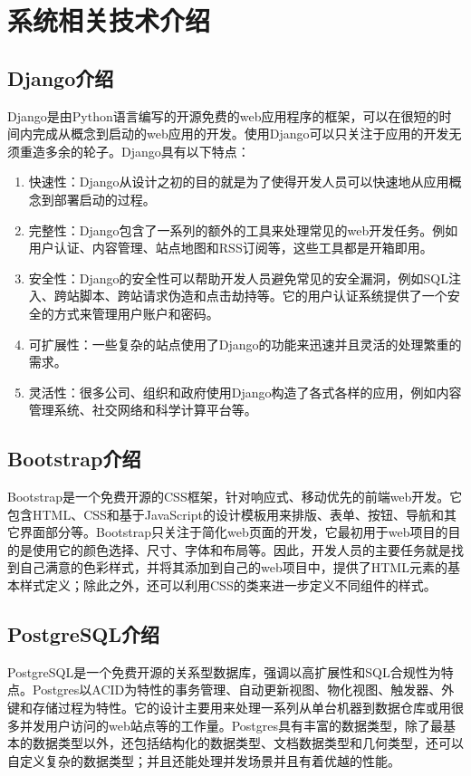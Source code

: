 \section{系统相关技术介绍}

\subsection{Django介绍}

Django是由Python语言编写的开源免费的web应用程序的框架，可以在很短的时间内完成从概念到启动的web应用的开发。使用Django可以只关注于应用的开发无须重造多余的轮子。Django具有以下特点：

\begin{enumerate}
    \item 快速性：Django从设计之初的目的就是为了使得开发人员可以快速地从应用概念到部署启动的过程。
    \item 完整性：Django包含了一系列的额外的工具来处理常见的web开发任务。例如用户认证、内容管理、站点地图和RSS订阅等，这些工具都是开箱即用。
    \item 安全性：Django的安全性可以帮助开发人员避免常见的安全漏洞，例如SQL注入、跨站脚本、跨站请求伪造和点击劫持等。它的用户认证系统提供了一个安全的方式来管理用户账户和密码。
    \item 可扩展性：一些复杂的站点使用了Django的功能来迅速并且灵活的处理繁重的需求。
    \item 灵活性：很多公司、组织和政府使用Django构造了各式各样的应用，例如内容管理系统、社交网络和科学计算平台等。
\end{enumerate}

\subsection{Bootstrap介绍}

Bootstrap是一个免费开源的CSS框架，针对响应式、移动优先的前端web开发。它包含HTML、CSS和基于JavaScript的设计模板用来排版、表单、按钮、导航和其它界面部分等。Bootstrap只关注于简化web页面的开发，它最初用于web项目的目的是使用它的颜色选择、尺寸、字体和布局等。因此，开发人员的主要任务就是找到自己满意的色彩样式，并将其添加到自己的web项目中，提供了HTML元素的基本样式定义；除此之外，还可以利用CSS的类来进一步定义不同组件的样式。

\subsection{PostgreSQL介绍}

PostgreSQL是一个免费开源的关系型数据库，强调以高扩展性和SQL合规性为特点。Postgres以ACID为特性的事务管理、自动更新视图、物化视图、触发器、外键和存储过程为特性。它的设计主要用来处理一系列从单台机器到数据仓库或用很多并发用户访问的web站点等的工作量。Postgres具有丰富的数据类型，除了最基本的数据类型以外，还包括结构化的数据类型、文档数据类型和几何类型，还可以自定义复杂的数据类型；并且还能处理并发场景并且有着优越的性能。

